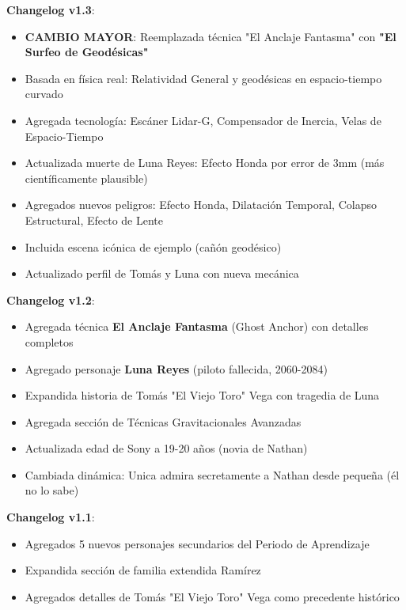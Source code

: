 \documentclass[11pt,a4paper]{report}
\begin{document}
\textbf{Changelog v1.3}:
\begin{itemize}
  \item \textbf{CAMBIO MAYOR}: Reemplazada técnica "El Anclaje Fantasma" con \textbf{"El Surfeo de Geodésicas"}
  \item Basada en física real: Relatividad General y geodésicas en espacio-tiempo curvado
  \item Agregada tecnología: Escáner Lidar-G, Compensador de Inercia, Velas de Espacio-Tiempo
  \item Actualizada muerte de Luna Reyes: Efecto Honda por error de 3mm (más científicamente plausible)
  \item Agregados nuevos peligros: Efecto Honda, Dilatación Temporal, Colapso Estructural, Efecto de Lente
  \item Incluida escena icónica de ejemplo (cañón geodésico)
  \item Actualizado perfil de Tomás y Luna con nueva mecánica

\end{itemize}
\textbf{Changelog v1.2}:
\begin{itemize}
  \item Agregada técnica \textbf{El Anclaje Fantasma} (Ghost Anchor) con detalles completos
  \item Agregado personaje \textbf{Luna Reyes} (piloto fallecida, 2060-2084)
  \item Expandida historia de Tomás "El Viejo Toro" Vega con tragedia de Luna
  \item Agregada sección de Técnicas Gravitacionales Avanzadas
  \item Actualizada edad de Sony a 19-20 años (novia de Nathan)
  \item Cambiada dinámica: Unica admira secretamente a Nathan desde pequeña (él no lo sabe)

\end{itemize}
\textbf{Changelog v1.1}:
\begin{itemize}
  \item Agregados 5 nuevos personajes secundarios del Periodo de Aprendizaje
  \item Expandida sección de familia extendida Ramírez
  \item Agregados detalles de Tomás "El Viejo Toro" Vega como precedente histórico

\end{itemize}
\end{document}

